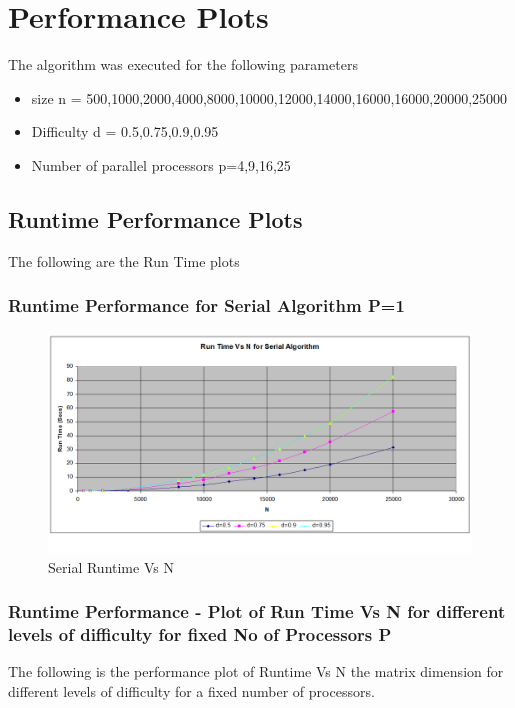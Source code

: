 \documentclass[twoside,11pt]{article}\usepackage{amsmath,amsfonts,amsthm,fullpage}
\begin{document}
\pagebreak
\section{Performance Plots}
The algorithm was executed for the following parameters
\begin{itemize}
\item
size n = 500,1000,2000,4000,8000,10000,12000,14000,16000,16000,20000,25000
\item
Difficulty d = 0.5,0.75,0.9,0.95
\item
Number of parallel processors p=4,9,16,25
\end{itemize}


\subsection{Runtime Performance Plots}

The following are the Run Time plots

\subsubsection{Runtime Performance for Serial Algorithm P=1}

\begin{figure}[!htbp]
\centering
\includegraphics[scale=.46]{charts/runtime_n_d_p_1_serial} 
\caption{Serial Runtime Vs N}
\label{Serial Runtime Vs N}
\end{figure}



\pagebreak
\subsubsection{Runtime Performance - Plot of Run Time Vs N for different levels of difficulty for fixed No of Processors P}
The following is the performance plot of Runtime Vs N the matrix dimension for different levels of difficulty for a fixed number of processors.
\end{document}
